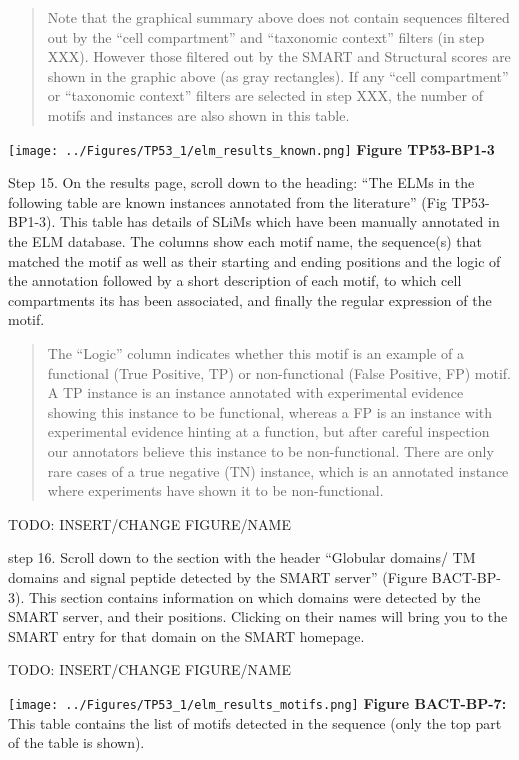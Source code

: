 \begin{quote}
Note that the graphical summary above does not contain sequences
filtered out by the ``cell compartment'' and ``taxonomic context''
filters (in step XXX). However those filtered out by the SMART and
Structural scores are shown in the graphic above (as gray rectangles).
If any ``cell compartment'' or ``taxonomic context'' filters are
selected in step XXX, the number of motifs and instances are also shown
in this table.
\end{quote}

\texttt{[image: ../Figures/TP53\_1/elm\_results\_known.png]} \textbf{Figure
TP53-BP1-3}

Step 15. On the results page, scroll down to the heading: ``The ELMs in
the following table are known instances annotated from the literature''
(Fig TP53-BP1-3). This table has details of SLiMs which have been
manually annotated in the ELM database. The columns show each motif
name, the sequence(s) that matched the motif as well as their starting
and ending positions and the logic of the annotation followed by a short
description of each motif, to which cell compartments its has been
associated, and finally the regular expression of the motif.

\begin{quote}
The ``Logic'' column indicates whether this motif is an example of a
functional (True Positive, TP) or non-functional (False Positive, FP)
motif. A TP instance is an instance annotated with experimental evidence
showing this instance to be functional, whereas a FP is an instance with
experimental evidence hinting at a function, but after careful
inspection our annotators believe this instance to be non-functional.
There are only rare cases of a true negative (TN) instance, which is an
annotated instance where experiments have shown it to be non-functional.
\end{quote}

TODO: INSERT/CHANGE FIGURE/NAME

step 16. Scroll down to the section with the header ``Globular domains/
TM domains and signal peptide detected by the SMART server'' (Figure
BACT-BP-3). This section contains information on which domains were
detected by the SMART server, and their positions. Clicking on their
names will bring you to the SMART entry for that domain on the SMART
homepage.

TODO: INSERT/CHANGE FIGURE/NAME

\texttt{[image: ../Figures/TP53\_1/elm\_results\_motifs.png]}
\textbf{Figure BACT-BP-7:} This table contains the list of motifs
detected in the sequence (only the top part of the table is shown).

